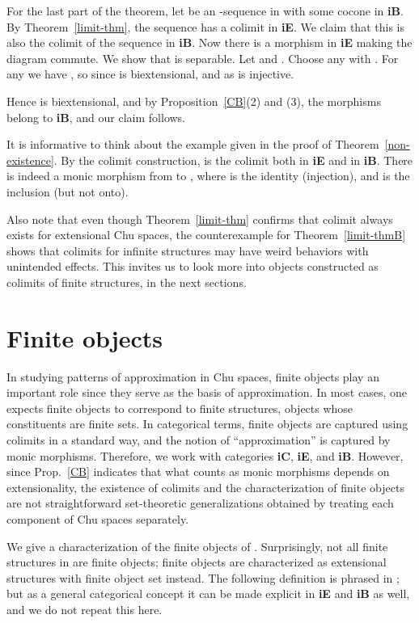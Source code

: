 \documentclass{LMCS}
\let\epf\endproof
\begin{document}
For the last part of the theorem, let  be an -sequence in  with some cocone  in {\bf iB}. By
Theorem~\ref{limit-thm}, the sequence  has a colimit  in
{\bf iE}. We claim that this is also the colimit of the sequence in
{\bf iB}. Now there is a morphism  in {\bf
  iE} making the diagram commute. We show that  is separable. 
Let  and . Choose any  with  . For any  we have
, so  since  is
biextensional, and  as  is injective. 

Hence  is biextensional, and by Proposition~\ref{CB}(2) and
(3), the morphisms   belong
to {\bf iB}, and our claim follows. 
\epf

It is informative to think about the example given in the proof of
Theorem~\ref{non-existence}.  By the colimit construction,  is the colimit both in {\bf
  iE} and in {\bf iB}. 
There is indeed a monic morphism  from  to , where  is the identity
(injection), and  is the inclusion (but not onto). 

Also note that even though Theorem~\ref{limit-thm}
confirms that colimit always exists for extensional Chu spaces,
the counterexample for Theorem~\ref{limit-thmB} shows that
colimits for infinite structures may have weird behaviors with unintended
effects. This invites us to look more into objects constructed as colimits of finite structures,
in the next sections. 

\section{Finite objects}


\noindent In studying patterns of approximation in Chu spaces, finite
objects play an important role since they serve as the basis of
approximation.  In most cases, one expects finite objects to
correspond to finite structures, objects whose constituents are finite
sets.  In categorical terms, finite objects are captured using
colimits in a standard way, and the notion of ``approximation'' is
captured by monic morphisms.  Therefore, we work with categories {\bf
  iC}, {\bf iE}, and {\bf iB}.  However, since Prop.~\ref{CB}
indicates that what counts as monic morphisms depends on
extensionality, the existence of colimits and the characterization of
finite objects are not straightforward set-theoretic generalizations
obtained by treating each component of Chu spaces separately.

We give a characterization of the finite objects of . 
Surprisingly, not all finite structures in  are finite
objects; finite objects are characterized as extensional structures
with finite object set instead. 
The following definition is phrased in ; but as a general
categorical concept it can be made explicit in {\bf iE} and {\bf iB}
as well, and we do not repeat this here. 
\end{document}
